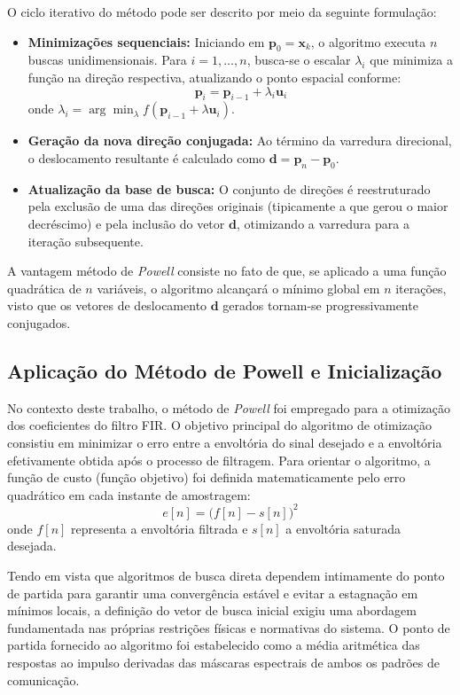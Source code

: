 O ciclo iterativo do método pode ser descrito por meio da seguinte formulação:
\begin{itemize}
	\item \textbf{Minimizações sequenciais:} Iniciando em $\mathbf{p}_0 = \mathbf{x}_k$, o algoritmo executa $n$ buscas unidimensionais. Para $i = 1, \dots, n$, busca-se o escalar $\lambda_i$ que minimiza a função na direção respectiva, atualizando o ponto espacial conforme:
	\begin{equation}
		\mathbf{p}_i = \mathbf{p}_{i-1} + \lambda_i \mathbf{u}_i
	\end{equation}
	onde $\lambda_i = \arg\min_{\lambda} f(\mathbf{p}_{i-1} + \lambda \mathbf{u}_i)$.
	\item \textbf{Geração da nova direção conjugada:} Ao término da varredura direcional, o deslocamento resultante é calculado como $\mathbf{d} = \mathbf{p}_n - \mathbf{p}_0$.
	\item \textbf{Atualização da base de busca:} O conjunto de direções é reestruturado pela exclusão de uma das direções originais (tipicamente a que gerou o maior decréscimo) e pela inclusão do vetor $\mathbf{d}$, otimizando a varredura para a iteração subsequente.
\end{itemize}

A vantagem método de \textit{Powell} consiste no fato de que, se aplicado a uma função quadrática de $n$ variáveis, o algoritmo alcançará o mínimo global em $n$ iterações, visto que os vetores de deslocamento $\mathbf{d}$ gerados tornam-se progressivamente conjugados.

\subsection{Aplicação do Método de Powell e Inicialização}
No contexto deste trabalho, o método de \textit{Powell} foi empregado para a otimização dos coeficientes do filtro FIR. O objetivo principal do algoritmo de otimização consistiu em minimizar o erro entre a envoltória do sinal desejado e a envoltória efetivamente obtida após o processo de filtragem. Para orientar o algoritmo, a função de custo (função objetivo) foi definida matematicamente pelo erro quadrático em cada instante de amostragem:
\begin{equation}
	e[n] = \big( f[n] - s[n] \big)^2
\end{equation}
\noindent onde $f[n]$ representa a envoltória filtrada e $s[n]$ a envoltória saturada desejada.

Tendo em vista que algoritmos de busca direta dependem intimamente do ponto de partida para garantir uma convergência estável e evitar a estagnação em mínimos locais, a definição do vetor de busca inicial exigiu uma abordagem fundamentada nas próprias restrições físicas e normativas do sistema. O ponto de partida fornecido ao algoritmo foi estabelecido como a média aritmética das respostas ao impulso derivadas das máscaras espectrais de ambos os padrões de comunicação. 

